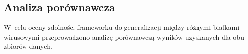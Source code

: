 
\subsection{Analiza porównawcza}
\label{sec:cross-analysis}

W~celu oceny zdolności frameworku do generalizacji między różnymi białkami wirusowymi przeprowadzono analizę porównawczą wyników uzyskanych dla obu zbiorów danych.




